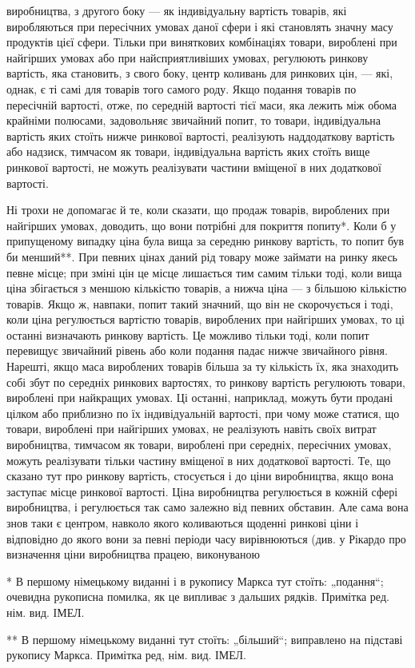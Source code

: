 виробництва, з другого боку — як індивідуальну вартість товарів,
які виробляються при пересічних умовах даної сфери і які становлять
значну масу продуктів цієї сфери. Тільки при виняткових
комбінаціях товари, вироблені при найгірших умовах або
при найсприятливіших умовах, регулюють ринкову вартість, яка становить,
з свого боку, центр коливань для ринкових цін, —
які, однак, є ті самі для товарів того самого роду. Якщо подання
товарів по пересічній вартості, отже, по середній вартості
тієї маси, яка лежить між обома крайніми полюсами,
задовольняє звичайний попит, то товари, індивідуальна вартість
яких стоїть нижче ринкової вартості, реалізують наддодаткову
вартість або надзиск, тимчасом як товари, індивідуальна вартість
яких стоїть вище ринкової вартості, не можуть реалізувати
частини вміщеної в них додаткової вартості.

Ні трохи не допомагає й те, коли сказати, що продаж товарів,
вироблених при найгірших умовах, доводить, що вони
потрібні для покриття попиту*. Коли б у припущеному випадку
ціна була вища за середню ринкову вартість, то попит був би
менший**. При певних цінах даний рід товару може займати
на ринку якесь певне місце; при зміні цін це місце лишається
тим самим тільки тоді, коли вища ціна збігається з меншою
кількістю товарів, а нижча ціна — з більшою кількістю товарів.
Якщо ж, навпаки, попит такий значний, що він не скорочується
і тоді, коли ціна регулюється вартістю товарів, вироблених при
найгірших умовах, то ці останні визначають ринкову вартість.
Це можливо тільки тоді, коли попит перевищує звичайний рівень
або коли подання падає нижче звичайного рівня. Нарешті,
якщо маса вироблених товарів більша за ту кількість їх, яка
знаходить собі збут по середніх ринкових вартостях, то ринкову
вартість регулюють товари, вироблені при найкращих
умовах. Ці останні, наприклад, можуть бути продані цілком або
приблизно по їх індивідуальній вартості, при чому може статися,
що товари, вироблені при найгірших умовах, не реалізують навіть
своїх витрат виробництва, тимчасом як товари, вироблені
при середніх, пересічних умовах, можуть реалізувати тільки частину
вміщеної в них додаткової вартості. Те, що сказано тут
про ринкову вартість, стосується і до ціни виробництва, якщо
вона заступає місце ринкової вартості. Ціна виробництва регулюється
в кожній сфері виробництва, і регулюється так само
залежно від певних обставин. Але сама вона знов таки є центром,
навколо якого коливаються щоденні ринкові ціни і відповідно
до якого вони за певні періоди часу вирівнюються (див.
у Рікардо про визначення ціни виробництва працею, виконуваною

* В першому німецькому виданні і в рукопису Маркса тут стоїть: „подання“;
очевидна рукописна помилка, як це випливає з дальших рядків. Примітка
ред. нім. вид. ІМЕЛ.

** В першому німецькому виданні тут стоїть: „більший“; виправлено на
підставі рукопису Маркса. Примітка ред, нім. вид. ІМЕЛ.
